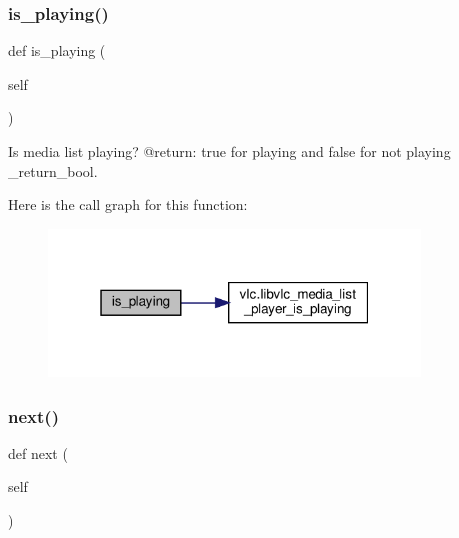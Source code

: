 \subsubsection{\texorpdfstring{is\+\_\+playing()}{is\_playing()}}
{\footnotesize\ttfamily def is\+\_\+playing (\begin{DoxyParamCaption}\item[{}]{self }\end{DoxyParamCaption})}

\begin{DoxyVerb}Is media list playing?
@return: true for playing and false for not playing \libvlc_return_bool.
\end{DoxyVerb}
 Here is the call graph for this function\+:
\nopagebreak
\begin{figure}[H]
\begin{center}
\leavevmode
\includegraphics[width=280pt]{classvlc_1_1_media_list_player_a48c6394263dfdf45970dbd872d52c8d8_cgraph}
\end{center}
\end{figure}
\mbox{\label{classvlc_1_1_media_list_player_a9dbee9488c9365114fed347d1a8846f1}} 
\subsubsection{\texorpdfstring{next()}{next()}}
{\footnotesize\ttfamily def next (\begin{DoxyParamCaption}\item[{}]{self }\end{DoxyParamCaption})}

